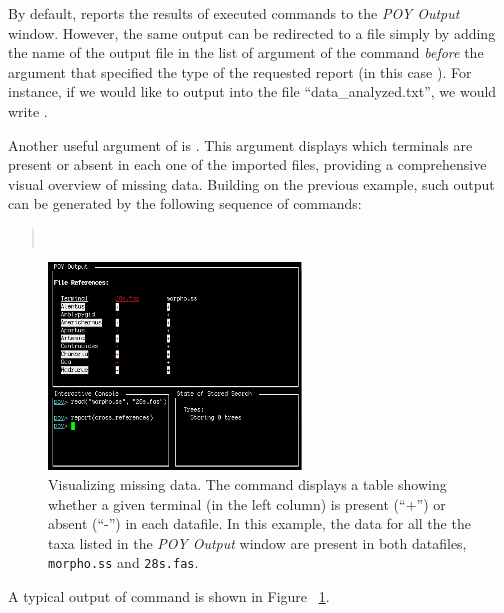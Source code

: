 By default, \poy reports the results of executed commands to the \emph{POY Output} window. However, the same output can be redirected to a file simply by adding the name of the output file in the list of argument of the command  \emph{before} the argument that specified the type of the requested report (in this case ). For instance, if we would like to output into the file ``data\_analyzed.txt'', we would write .

Another useful argument of  is . This argument displays which terminals are present or absent in each one of the imported files, providing a comprehensive visual overview of missing data. Building on the previous example, such output can be generated by the following sequence of commands:
\begin{quote}
    \\
\end{quote}

\begin{figure}[]
    \begin{center}
        \includegraphics[width=0.6\textwidth]{figures/crossref.jpg}
    \end{center}
    \caption{Visualizing missing data. The command  displays a table showing whether a given terminal (in the left column) is present (``+'') or absent (``-'') in each datafile. In this example, the data for all the the taxa listed in the \emph{POY Output} window are present in both datafiles, \texttt{morpho.ss} and \texttt{28s.fas}.}
    \label{fig:crossref}
\end{figure}

A typical output of  command is shown in Figure ~\ref{fig:crossref}.

